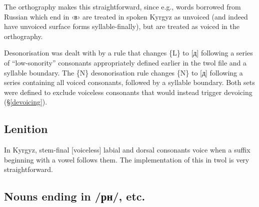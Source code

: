 \documentclass[10pt,a4paper,twocolumn]{article}
\begin{document}
The orthography makes this straightforward, since e.g., words borrowed from Russian which end in ‹в› are treated in spoken Kyrgyz as unvoiced (and indeed have unvoiced surface forms syllable-finally), but are treated as voiced in the orthography.

Desonorisation was dealt with by a rule that changes \{L\} to [д] following a series of ``low-sonority'' consonants appropriately defined earlier in the twol file and a syllable boundary.  The \{N\} desonorisation rule changes \{N\} to [д] following a series containing all voiced consonants, followed by a syllable boundary.  Both sets were defined to exclude voiceless consonants that would instead trigger devoicing (§\ref{devoicing}).


\subsection{Lenition}
In Kyrgyz, stem-final [voiceless] labial and dorsal consonants voice when a suffix beginning with a vowel follows them.  The implementation of this in twol is very straightforward.


\subsection{Nouns ending in /рн/, etc.}
\end{document}
